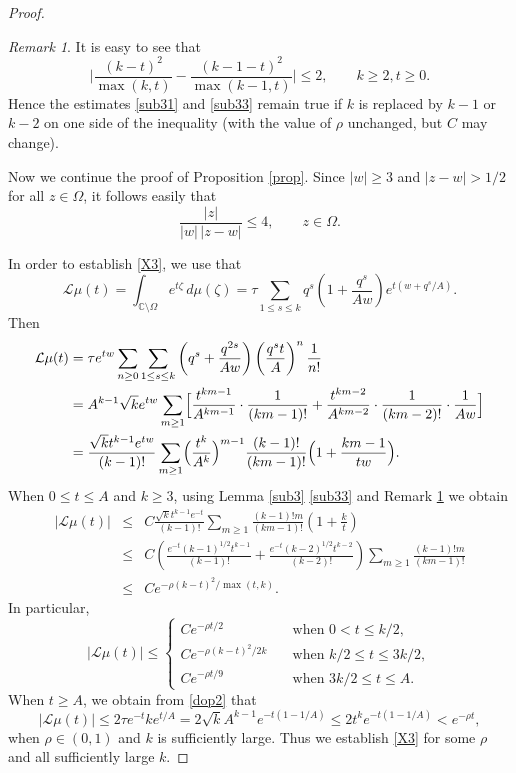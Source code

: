 \documentclass[11pt]{amsart}
\theoremstyle{definition}
\theoremstyle{remark}
\newtheorem{remark}[theorem]{Remark}
\numberwithin{equation}{section}
\begin{document}
\begin{proof}
{\relax}

\begin{remark} \label{rem3}
It is easy to see that
$$
\Big| \frac{(k-t)^2}{\max(k,t)} - \frac{(k-1-t)^2}{\max(k-1,t)} \Big| \le 2, \qquad k\ge2, t \ge 0.
$$
Hence the estimates \eqref{sub31} and \eqref{sub33} remain true if $k$ is replaced by $k-1$ or $k-2$ on one side of the inequality (with the value of $\rho$ unchanged, but $C$ may change).
\end{remark}

Now we continue the proof of Proposition \ref{prop}.  
Since $|w|\ge3$ and $|z-w| > 1/2$ for all $z \in \Omega$, it follows easily that
\begin{equation}  \label{zw}
\frac{|z|}{|w|\,|z-w|}  \le 4, \qquad z \in \Omega.
\end{equation}

In order to establish \eqref{X3}, we use that
\begin{equation}
\label{dop2}
{{\mathcal L}}\mu(t) =\int_{\mathbb C \setminus
\Omega} e^{t\zeta}\,d\mu(\zeta)  =
\tau\sum_{1 \le s \le k}q^s \left(1+ \frac{q^s}{Aw}\right)e^{t(w+q^s/A)}.
\end{equation}
Then
\begin{align*}
{{\mathcal L}}\mu(t) 
&= \tau e^{tw} \sum_{n\ge 0} \sum_{1 \le s \le k} \left( q^s+ \frac{q^{2s}}{Aw} \right) \left( \frac{q^st}{A} \right)^n\frac 1{n!} \nonumber \\
&=
A^{k-1} \sqrt{k} e^{tw} \sum_{m\ge 1}\Bigl[\frac{t^{km-1}}{A^{km-1}}\cdot \frac
1{(km-1)!}+ \frac{t^{km-2}}{A^{km-2}}\cdot \frac 1{(km-2)!}\cdot
\frac 1{Aw} \Bigr] \nonumber \\
&= \frac{\sqrt{k} t^{k-1} e^{tw}}{(k-1)!}\sum_{m\ge 1}
\Bigl(\frac{t^k}{A^k}\Bigr)^{m-1}\frac{(k-1)!}{(km-1)!} \Bigl(1+
\frac {km-1}{tw}\Bigr). \nonumber
\end{align*}
When  $0\le t\le A$ and $k\ge3$, using  Lemma \ref{sub3} \eqref{sub33} and Remark \ref{rem3} we obtain
\begin{eqnarray*}
|{{\mathcal L}}\mu(t)| 
&\le& C  \frac{\sqrt{k} t^{k-1}e^{-t}}{(k-1)!}\sum_{m\ge 1}
\frac{(k-1)!m}{(km-1)!} \left(1 + \frac{k}{t}\right)\\
&\le& C \left( \frac{e^{-t}(k-1)^{1/2}t^{k-1}}{(k-1)!} + \frac{e^{-t}(k-2)^{1/2}t^{k-2}}{(k-2)!} \right) \sum_{m\ge1} \frac{ (k-1)! m}{(km-1)!} \\
& \le& C e^{-\rho (k-t)^2/\max(t,k)}.
\end{eqnarray*}
In particular,
$$
|{{\mathcal L}}\mu(t)| \le \begin{cases} C e^{-\rho t/2} \quad &\text{when $0 < t \le k/2$}, \\ C e^{-\rho (k-t)^2/2k} \quad &\text{when $k/2 \le t \le 3k/2$}, \\ Ce^{-\rho t/9} &\text{when $3k/2 \le t \le A$}. \end{cases}
$$
When $t\ge A$, we obtain from \eqref{dop2} that
$$
|{{\mathcal L}}\mu(t)| \le 2\tau e^{-t}k e^{t/A}=2 \sqrt{k} A^{k-1} e^{-t(1-1/A)} \le 2t^k e^{-t(1-1/A)} < e^{-\rho t},
$$
when $\rho \in (0,1)$ and $k$ is sufficiently large.  Thus we establish \eqref{X3}  for some $\rho$ and all sufficiently large $k$.
\smallskip


\end{proof}
\end{document}
